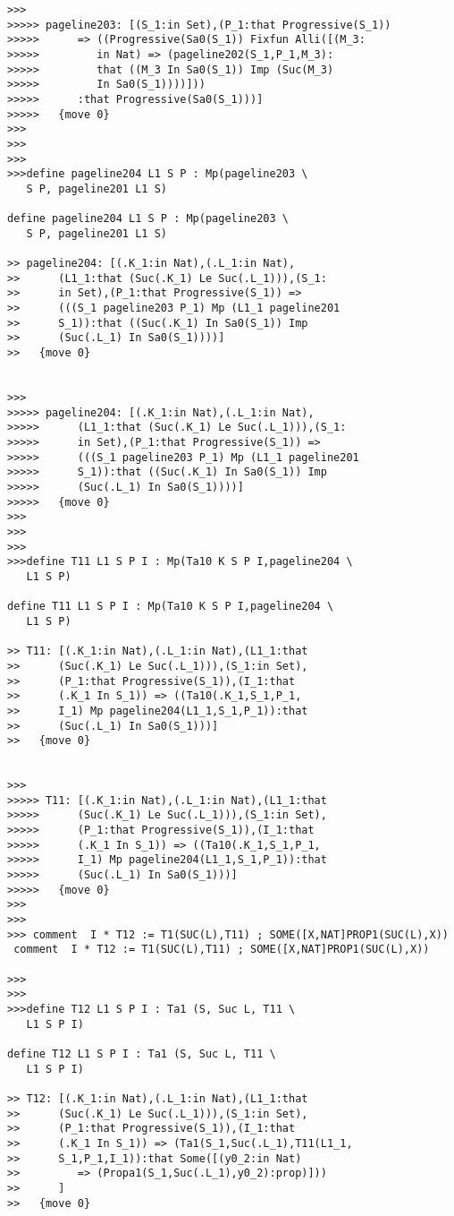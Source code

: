 \documentclass{article}
\begin{document}
\begin{verbatim}
>>>
>>>>> pageline203: [(S_1:in Set),(P_1:that Progressive(S_1))
>>>>>      => ((Progressive(Sa0(S_1)) Fixfun Alli([(M_3:
>>>>>         in Nat) => (pageline202(S_1,P_1,M_3):
>>>>>         that ((M_3 In Sa0(S_1)) Imp (Suc(M_3)
>>>>>         In Sa0(S_1))))]))
>>>>>      :that Progressive(Sa0(S_1)))]
>>>>>   {move 0}
>>>
>>>
>>>
>>>define pageline204 L1 S P : Mp(pageline203 \
   S P, pageline201 L1 S)

define pageline204 L1 S P : Mp(pageline203 \
   S P, pageline201 L1 S)

>> pageline204: [(.K_1:in Nat),(.L_1:in Nat),
>>      (L1_1:that (Suc(.K_1) Le Suc(.L_1))),(S_1:
>>      in Set),(P_1:that Progressive(S_1)) =>
>>      (((S_1 pageline203 P_1) Mp (L1_1 pageline201
>>      S_1)):that ((Suc(.K_1) In Sa0(S_1)) Imp
>>      (Suc(.L_1) In Sa0(S_1))))]
>>   {move 0}


>>>
>>>>> pageline204: [(.K_1:in Nat),(.L_1:in Nat),
>>>>>      (L1_1:that (Suc(.K_1) Le Suc(.L_1))),(S_1:
>>>>>      in Set),(P_1:that Progressive(S_1)) =>
>>>>>      (((S_1 pageline203 P_1) Mp (L1_1 pageline201
>>>>>      S_1)):that ((Suc(.K_1) In Sa0(S_1)) Imp
>>>>>      (Suc(.L_1) In Sa0(S_1))))]
>>>>>   {move 0}
>>>
>>>
>>>
>>>define T11 L1 S P I : Mp(Ta10 K S P I,pageline204 \
   L1 S P)

define T11 L1 S P I : Mp(Ta10 K S P I,pageline204 \
   L1 S P)

>> T11: [(.K_1:in Nat),(.L_1:in Nat),(L1_1:that
>>      (Suc(.K_1) Le Suc(.L_1))),(S_1:in Set),
>>      (P_1:that Progressive(S_1)),(I_1:that
>>      (.K_1 In S_1)) => ((Ta10(.K_1,S_1,P_1,
>>      I_1) Mp pageline204(L1_1,S_1,P_1)):that
>>      (Suc(.L_1) In Sa0(S_1)))]
>>   {move 0}


>>>
>>>>> T11: [(.K_1:in Nat),(.L_1:in Nat),(L1_1:that
>>>>>      (Suc(.K_1) Le Suc(.L_1))),(S_1:in Set),
>>>>>      (P_1:that Progressive(S_1)),(I_1:that
>>>>>      (.K_1 In S_1)) => ((Ta10(.K_1,S_1,P_1,
>>>>>      I_1) Mp pageline204(L1_1,S_1,P_1)):that
>>>>>      (Suc(.L_1) In Sa0(S_1)))]
>>>>>   {move 0}
>>>
>>>
>>> comment  I * T12 := T1(SUC(L),T11) ; SOME([X,NAT]PROP1(SUC(L),X))
 comment  I * T12 := T1(SUC(L),T11) ; SOME([X,NAT]PROP1(SUC(L),X))

>>>
>>>
>>>define T12 L1 S P I : Ta1 (S, Suc L, T11 \
   L1 S P I)

define T12 L1 S P I : Ta1 (S, Suc L, T11 \
   L1 S P I)

>> T12: [(.K_1:in Nat),(.L_1:in Nat),(L1_1:that
>>      (Suc(.K_1) Le Suc(.L_1))),(S_1:in Set),
>>      (P_1:that Progressive(S_1)),(I_1:that
>>      (.K_1 In S_1)) => (Ta1(S_1,Suc(.L_1),T11(L1_1,
>>      S_1,P_1,I_1)):that Some([(y0_2:in Nat)
>>         => (Propa1(S_1,Suc(.L_1),y0_2):prop)]))
>>      ]
>>   {move 0}



\end{verbatim}
\end{document}
